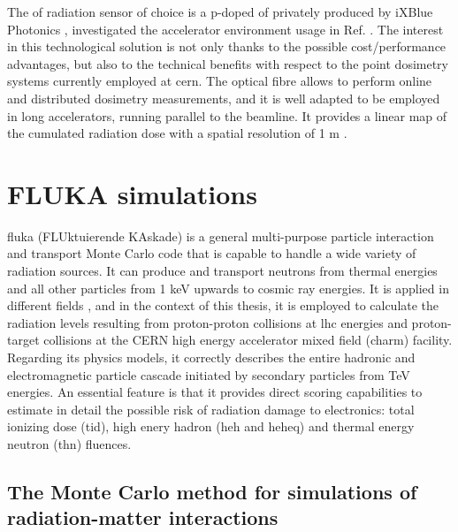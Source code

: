 \documentclass[encoding=utf8,british]{tumphthesis}
\begin{document}
The  \acrshort{of}  radiation  sensor  of  choice  is  a  p-doped    \acrshort{of} privately produced by  iXBlue  Photonics \cite{OF:manufacturer-ixblue-photonics},  investigated the accelerator environment usage in Ref. \cite{difrancesca:hal-02061611, Diego:OF}. The interest in this technological solution is not only thanks to the possible cost/performance advantages, but also to the technical benefits with respect to the point dosimetry systems currently employed  at  \acrshort{cern}. The optical fibre allows to perform online and distributed dosimetry measurements, and it is well adapted to be employed in long accelerators, running parallel to the beamline. It provides a linear map of the cumulated radiation dose with a spatial resolution of 1 m \cite{Henschel:2004de}.


\section{FLUKA simulations}
\label{section:FLUKA}

\acrshort{fluka} \cite{b4, b5, b6} (FLUktuierende KAskade) is a general multi-purpose particle interaction and transport Monte Carlo code that is capable to handle a wide variety of radiation sources. It can produce and transport neutrons from thermal energies and all other particles from 1 keV upwards to cosmic ray energies. It is applied in different fields \cite{FLUKA-Capabilities-and-CERN-Applications-for-the-Study-of-Radiation-Damage-to-Electronics-at-High-Energy-Hadron-Accelerators}, and in the context of this thesis, it is employed to calculate the radiation levels resulting from proton-proton collisions at \acrshort{lhc} energies and proton-target collisions at the CERN high energy accelerator mixed field (\acrshort{charm}) facility. Regarding its physics models, it correctly describes the entire hadronic and electromagnetic particle cascade initiated by secondary particles from TeV energies. An essential feature is that it provides direct scoring capabilities to estimate in detail the possible risk of radiation damage to electronics: total ionizing dose (\acrshort{tid}), high enery hadron (\acrshort{heh} and \acrshort{heheq}) and thermal energy neutron (\acrshort{thn}) fluences.


\subsection{The Monte Carlo method for simulations of radiation-matter interactions}
\label{subsection:monte-carlo}
\end{document}
